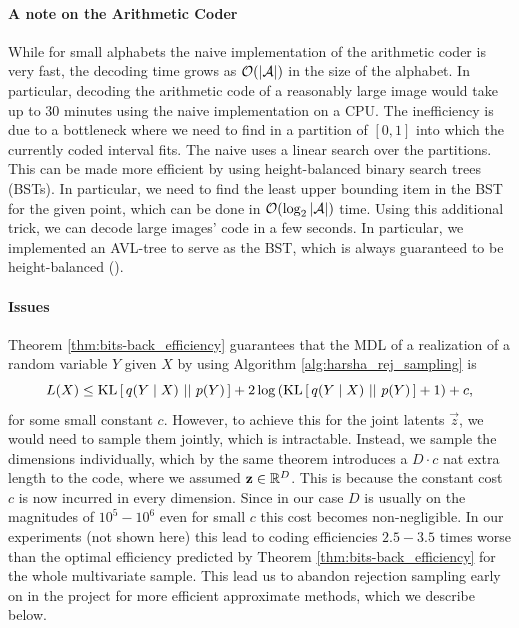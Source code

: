 \paragraph{A note on the Arithmetic Coder}
\par
While for small alphabets the naive implementation of the arithmetic coder is
very fast, the decoding time grows as $\mathcal{O}(|\mathcal{A}|)$ in the size of the
alphabet. In particular, decoding the arithmetic code of a reasonably large
image would take up to 30 minutes using the naive implementation on a CPU. The
inefficiency is due to a bottleneck where we need to find in a partition of $[0,
1]$ into which the currently coded interval fits. The naive
uses a linear search over the partitions. This can be made more efficient by
using height-balanced binary search trees (BSTs). In particular, we need to find
the least upper bounding item in the BST for the given point, which can be done
in $\mathcal{O}(\log_2|\mathcal{A}|)$ time.
Using this additional trick, we can decode large images' code in a few seconds.
In particular, we implemented an AVL-tree to serve as the BST, which is always
guaranteed to be height-balanced (\cite{adel1962algorithm}).

\paragraph{Issues} Theorem \ref{thm:bits-back_efficiency} guarantees that the
MDL of a realization of a random variable $Y$ given $X$ by using Algorithm
\ref{alg:harsha_rej_sampling} is
\[
  L(X) \leq \mathrm{KL}\left[\,q(Y \mid X)\,\,||\,\,p(Y)\,\right] + 2\log\left( \mathrm{KL}\left[\,q(Y \mid X)\,\,||\,\,p(Y)\,\right] + 1
  \right) + c,
\]
for some small constant $c$.
However, to achieve this for the joint latents $\vec{z}$, we would need to
sample them jointly, which is intractable. Instead, we sample the
dimensions individually, which by the same theorem introduces a $D\cdot c$ nat
extra length to the code, where we assumed $\mathbf{z} \in \mathbb{R}^D$. This is
because the constant cost $c$ is now incurred in every dimension. Since in our
case $D$ is usually on the magnitudes of $10^5 - 10^6$ even for small $c$ this
cost becomes non-negligible. In our experiments (not shown here) this lead to coding
efficiencies $2.5 - 3.5$ times worse than the optimal efficiency predicted by Theorem
\ref{thm:bits-back_efficiency} for the whole multivariate sample. This lead us
to abandon rejection sampling early on in the project for more efficient approximate methods,
which we describe below.

